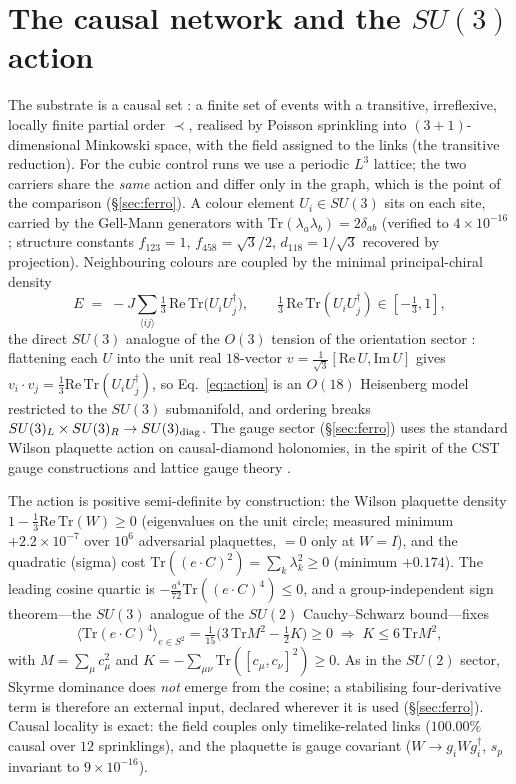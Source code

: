 \documentclass[aps,prd,reprint,nofootinbib,superscriptaddress,floatfix]{revtex4-2}
\newcommand{\Tr}{\mathrm{Tr}}
\begin{document}
\section{The causal network and the $SU(3)$ action}\label{sec:action}

The substrate is a causal set \cite{BLMS1987}: a finite set of events with a transitive,
irreflexive, locally finite partial order $\prec$, realised by Poisson sprinkling into
$(3{+}1)$-dimensional Minkowski space, with the field assigned to the links (the
transitive reduction). For the cubic control runs we use a periodic $L^3$ lattice; the
two carriers share the \emph{same} action and differ only in the graph, which is the
point of the comparison (\S\ref{sec:ferro}). A colour element $U_i\in SU(3)$ sits on each
site, carried by the Gell-Mann generators with $\Tr(\lambda_a\lambda_b)=2\delta_{ab}$
(verified to $4\times10^{-16}$; structure constants $f_{123}=1$, $f_{458}=\sqrt3/2$,
$d_{118}=1/\sqrt3$ recovered by projection). Neighbouring colours are coupled by the
minimal principal-chiral density
\begin{equation}
E \;=\; -J\sum_{\langle ij\rangle}\tfrac13\,\mathrm{Re}\,\Tr\!\big(U_iU_j^\dagger\big),
\qquad \tfrac13\,\mathrm{Re}\,\Tr(U_iU_j^\dagger)\in[-\tfrac13,1],
\label{eq:action}
\end{equation}
the direct $SU(3)$ analogue of the $O(3)$ tension of the orientation sector
\cite{GoldstonePRD}: flattening each $U$ into the unit real $18$-vector
$v=\tfrac1{\sqrt3}[\mathrm{Re}\,U,\mathrm{Im}\,U]$ gives $v_i\!\cdot\!v_j=\tfrac13
\mathrm{Re}\,\Tr(U_iU_j^\dagger)$, so Eq.~\eqref{eq:action} is an $O(18)$ Heisenberg model
restricted to the $SU(3)$ submanifold, and ordering breaks $SU(3)_L\times SU(3)_R\to
SU(3)_{\rm diag}$. The gauge sector (\S\ref{sec:ferro}) uses the standard Wilson
plaquette action on causal-diamond holonomies, in the spirit of the CST gauge constructions
\cite{Sverdlov2008,SverdlovBombelli2009} and lattice gauge theory \cite{Wilson1974}.

The action is positive semi-definite by construction: the Wilson plaquette density
$1-\tfrac13\mathrm{Re}\,\Tr(W)\ge0$ (eigenvalues on the unit circle; measured minimum
$+2.2\times10^{-7}$ over $10^6$ adversarial plaquettes, $=0$ only at $W=I$), and the
quadratic (sigma) cost $\Tr((e\!\cdot\!C)^2)=\sum_k\lambda_k^2\ge0$ (minimum $+0.174$).
The leading cosine quartic is $-\tfrac{a^4}{72}\Tr((e\!\cdot\!C)^4)\le0$, and a
group-independent sign theorem---the $SU(3)$ analogue of the $SU(2)$ Cauchy--Schwarz
bound---fixes
\begin{equation}
\big\langle\Tr(e\!\cdot\!C)^4\big\rangle_{e\in S^2}
=\tfrac1{15}\big(3\,\Tr M^2-\tfrac12 K\big)\ge0
\;\Longrightarrow\; K\le 6\,\Tr M^2,
\label{eq:sign}
\end{equation}
with $M=\sum_\mu c_\mu^2$ and $K=-\sum_{\mu\nu}\Tr([c_\mu,c_\nu]^2)\ge0$. As in the $SU(2)$
sector, Skyrme dominance does \emph{not} emerge from the cosine; a stabilising
four-derivative term is therefore an external input, declared wherever it is used
(\S\ref{sec:ferro}). Causal locality is exact: the field couples only timelike-related
links ($100.00\%$ causal over $12$ sprinklings), and the plaquette is gauge covariant
($W\to g_iWg_i^\dagger$, $s_p$ invariant to $9\times10^{-16}$).
\end{document}
